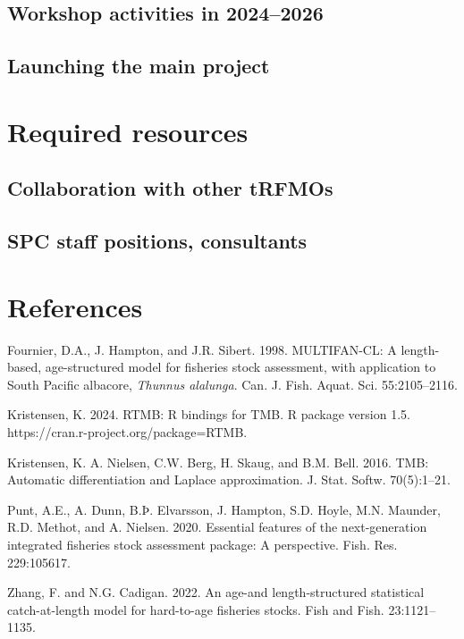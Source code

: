 \documentclass{SCreport}
\begin{document}
\subsection{Workshop activities in 2024--2026}

\subsection{Launching the main project}

\section{Required resources}

\subsection{Collaboration with other tRFMOs}

\subsection{SPC staff positions, consultants}

\section{References}

\sloppy\setlength{}

\begin{description}\setlength\itemsep{0ex}
  \item Fournier, D.A., J. Hampton, and J.R. Sibert. 1998. MULTIFAN-CL: A
  length-based, age-structured model for fisheries stock assessment, with
  application to South Pacific albacore, \textit{Thunnus alalunga}. Can. J.
  Fish. Aquat. Sci. 55:2105--2116.
  \item Kristensen, K. 2024. RTMB: R bindings for TMB. R package version 1.5.\\
  https://cran.r-project.org/package=RTMB.
  \item Kristensen, K. A. Nielsen, C.W. Berg, H. Skaug, and B.M. Bell. 2016.
  TMB: Automatic differentiation and Laplace approximation. J. Stat. Softw.
  70(5):1--21.
  \item Punt, A.E., A. Dunn, B.Þ. Elvarsson, J. Hampton, S.D. Hoyle, M.N.
  Maunder, R.D. Methot, and A. Nielsen. 2020. Essential features of the
  next-generation integrated fisheries stock assessment package: A perspective.
  Fish. Res. 229:105617.
  \item Zhang, F. and N.G. Cadigan. 2022. An age-and length-structured
  statistical catch-at-length model for hard-to-age fisheries stocks. Fish and
  Fish. 23:1121--1135.
\end{description}
\end{document}
